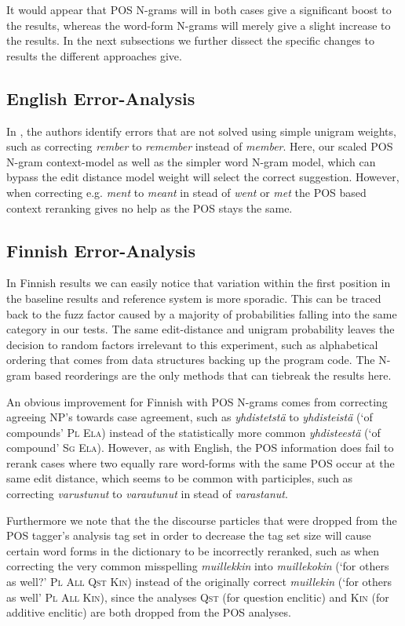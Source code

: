 \documentclass{llncs}
\begin{document}
It would appear that POS N-grams will in both cases give a significant boost to
the results, whereas the word-form N-grams will merely give a slight increase to
the results. In the next subsections we further dissect the specific changes to
results the different approaches give.

\subsection{English Error-Analysis}

In \cite{norvig/2010}, the authors identify errors that are not solved using
simple unigram weights, such as correcting \emph{rember} to \emph{remember}
instead of \emph{member}. Here, our scaled POS N-gram context-model as well
as the simpler word N-gram model, which can bypass the
edit distance model weight will select the correct suggestion. However, when
correcting e.g.  \emph{ment} to \emph{meant} in stead of \emph{went} or
\emph{met} the POS based context reranking gives no help as the POS stays the
same.

\subsection{Finnish Error-Analysis}

In Finnish results we can easily notice that variation within the first
position in the baseline results and reference system is more sporadic. This
can be traced back to the fuzz factor caused by a majority of probabilities
falling into the same category in our tests. The same edit-distance and unigram
probability leaves the decision to random factors irrelevant to this
experiment, such as alphabetical ordering that comes from data structures
backing up the program code. The N-gram based reorderings are the only methods
that can tiebreak the results here.

An obvious improvement for Finnish with POS N-grams comes from correcting
agreeing NP's towards case agreement, such as \emph{yhdistetstä} to
\emph{yhdisteistä} (`of compounds' \textsc{Pl Ela}) instead of the statistically
more common \emph{yhdisteestä} (`of compound' \textsc{Sg Ela}). However, as
with English, the POS information does fail to rerank cases where two equally
rare word-forms with the same POS occur at the same edit distance, which seems
to be common with participles, such as correcting \emph{varustunut} to
\emph{varautunut} in stead of \emph{varastanut}.

Furthermore we note that the the discourse particles that were dropped from the
POS tagger's analysis tag set in order to decrease the tag set size will cause
certain word forms in the dictionary to be incorrectly reranked, such as when
correcting the very common misspelling \emph{muillekkin} into
\emph{muillekokin} (`for others as well?' \textsc{Pl All Qst Kin}) instead of
the originally correct \emph{muillekin} (`for others as well' \textsc{Pl All
Kin}), since the analyses \textsc{Qst} (for question enclitic) and \textsc{Kin}
(for additive enclitic) are both dropped from the POS analyses.
\end{document}
